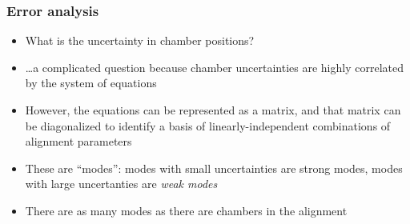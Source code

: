 \documentclass[compress]{beamer}
\begin{document}
\begin{frame}
\frametitle{Error analysis}

\begin{itemize}\setlength{\itemsep}{0.25 cm}
\item What is the uncertainty in chamber positions?
\item \ldots a complicated question because chamber uncertainties are highly
  correlated by the system of equations
\item However, the equations can be represented as a matrix, and that
  matrix can be diagonalized to identify a basis of
  linearly-independent combinations of alignment parameters
\item These are ``modes'': modes with small uncertainties are strong
  modes, modes with large uncertanties are {\it weak modes}
\item There are as many modes as there are chambers in the alignment
\end{itemize}
\end{frame}
\end{document}

